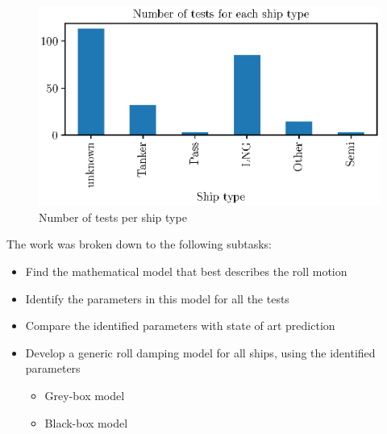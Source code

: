 \begin{figure}[H]
    \centering
    \includegraphics[width=0.5\columnwidth]{kappa/images/ship_types.eps}
    \caption{Number of tests per ship type}
    \label{fig:ship_types}
\end{figure}

\noindent The work was broken down to the following subtasks: 
\begin{itemize}
    \item Find the mathematical model that best describes the roll motion
    \item Identify the parameters in this model for all the tests
    \item Compare the identified parameters with state of art prediction
    \item Develop a generic roll damping model for all ships, using the identified parameters
    \begin{itemize}
        \item Grey-box model
        \item Black-box model
    \end{itemize}
\end{itemize}

